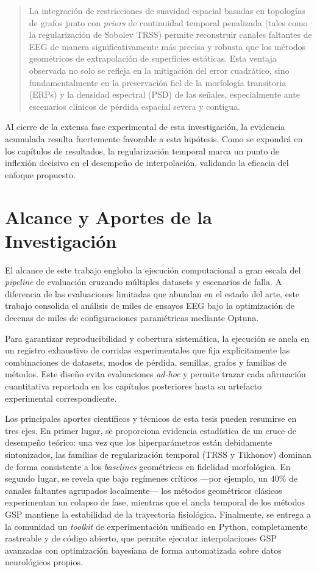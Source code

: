 \begin{quote}
La integración de restricciones de suavidad espacial basadas en topologías de grafos junto con \textit{priors} de continuidad temporal penalizada (tales como la regularización de Sobolev TRSS) permite reconstruir canales faltantes de EEG de manera significativamente más precisa y robusta que los métodos geométricos de extrapolación de superficies estáticas. Esta ventaja observada no solo se refleja en la mitigación del error cuadrático, sino fundamentalmente en la preservación fiel de la morfología transitoria (ERPs) y la densidad espectral (PSD) de las señales, especialmente ante escenarios clínicos de pérdida espacial severa y contigua.
\end{quote}

Al cierre de la extensa fase experimental de esta investigación, la evidencia acumulada resulta fuertemente favorable a esta hipótesis. Como se expondrá en los capítulos de resultados, la regularización temporal marca un punto de inflexión decisivo en el desempeño de interpolación, validando la eficacia del enfoque propuesto.

\section{Alcance y Aportes de la Investigación}

El alcance de este trabajo engloba la ejecución computacional a gran escala del \textit{pipeline} de evaluación cruzando múltiples datasets y escenarios de falla. A diferencia de las evaluaciones limitadas que abundan en el estado del arte, este trabajo consolida el análisis de miles de ensayos EEG bajo la optimización de decenas de miles de configuraciones paramétricas mediante Optuna.

Para garantizar reproducibilidad y cobertura sistemática, la ejecución se ancla en un registro exhaustivo de corridas experimentales que fija explícitamente las combinaciones de datasets, modos de pérdida, semillas, grafos y familias de métodos. Este diseño evita evaluaciones \textit{ad-hoc} y permite trazar cada afirmación cuantitativa reportada en los capítulos posteriores hasta su artefacto experimental correspondiente.

Los principales aportes científicos y técnicos de esta tesis pueden resumirse en tres ejes. En primer lugar, se proporciona evidencia estadística de un cruce de desempeño teórico: una vez que los hiperparámetros están debidamente sintonizados, las familias de regularización temporal (TRSS y Tikhonov) dominan de forma consistente a los \textit{baselines} geométricos en fidelidad morfológica. En segundo lugar, se revela que bajo regímenes críticos ---por ejemplo, un $40\%$ de canales faltantes agrupados localmente--- los métodos geométricos clásicos experimentan un colapso de fase, mientras que el ancla temporal de los métodos GSP mantiene la estabilidad de la trayectoria fisiológica. Finalmente, se entrega a la comunidad un \textit{toolkit} de experimentación unificado en Python, completamente rastreable y de código abierto, que permite ejecutar interpolaciones GSP avanzadas con optimización bayesiana de forma automatizada sobre datos neurológicos propios.

